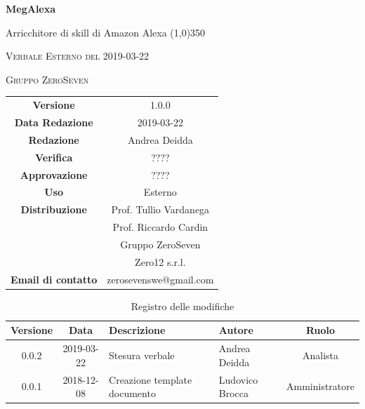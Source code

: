 \documentclass[a4paper,12pt]{article}
\author{Andrea Deidda}
\date{2019-03-22}
\begin{document}
	\begin{titlepage}
		\centering
		{\huge\bfseries MegAlexa\par}
		Arricchitore di skill di Amazon Alexa
		\line(1,0){350} \\
		{\scshape\LARGE Verbale Esterno del 2019-03-22 \par}
		\vspace{1cm}
		{\scshape Gruppo ZeroSeven \par}
		\logo
		\begin{tabular}{c|c}
			{\hfill \textbf{Versione}} 			& 1.0.0\\
			{\hfill\textbf{Data Redazione}} 	& 2019-03-22\\ 
			{\hfill\textbf{Redazione}} 			&  Andrea Deidda\\ 
			{\hfill\textbf{Verifica}} 			&  	???? \\ 
			{\hfill\textbf{Approvazione}} 		&  	???? \\ 
			{\hfill\textbf{Uso}} 					& 	Esterno	\\ 
			{\hfill\textbf{Distribuzione}} 			& 			Prof. Tullio Vardanega \\ & Prof. Riccardo Cardin \\ & Gruppo ZeroSeven \\ & Zero12 s.r.l.	\\ 
			{\hfill\textbf{Email di contatto}} & zerosevenswe@gmail.com \\
		\end{tabular}
	\end{titlepage}

	\label{LastFrontPage}
	
	\newpage
	\cleardoublepage
	\begin{table}[tbph]
		\centering
		\begin{tabularx}{\textwidth}{|c|c|X|X|c|}
			\hline
			\textbf{Versione} & \textbf{Data} & \textbf{Descrizione} & \textbf{Autore} & \textbf{Ruolo} \\
			\hline
			0.0.2 & 2019-03-22 & Stesura verbale & Andrea Deidda  & Analista \\
			\hline
			0.0.1 & 2018-12-08 & Creazione template documento & Ludovico Brocca & Amministratore\\
			\hline
		\end{tabularx}
		\caption{Registro delle modifiche}
	\end{table}
	\cleardoublepage
	\pagestyle{mymain}
	
	\tableofcontents
	\cleardoublepage
\end{document}
